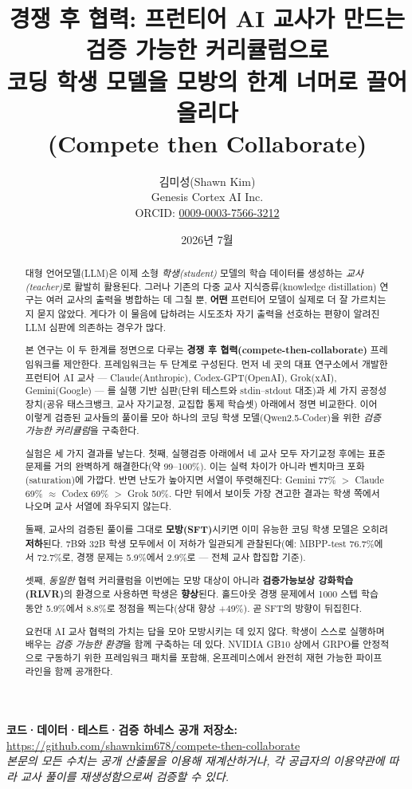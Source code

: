 \documentclass[11pt]{article}
\title{경쟁 후 협력: 프런티어 AI 교사가 만드는 검증 가능한 커리큘럼으로\\
코딩 학생 모델을 모방의 한계 너머로 끌어올리다\\[4pt]
\large\normalfont (Compete then Collaborate)}
\author{김미성(Shawn Kim) \\ \small Genesis Cortex AI Inc. \\ \small ORCID: \href{https://orcid.org/0009-0003-7566-3212}{0009-0003-7566-3212}}
\date{2026년 7월}
\begin{document}
\maketitle

\begin{center}
\small\textbf{코드·데이터·테스트·검증 하네스 공개 저장소:}
\url{https://github.com/shawnkim678/compete-then-collaborate}\\[-2pt]
\small\emph{본문의 모든 수치는 공개 산출물을 이용해 재계산하거나, 각 공급자의 이용약관에 따라 교사 풀이를 재생성함으로써 검증할 수 있다.}
\end{center}

\begin{abstract}
대형 언어모델(LLM)은 이제 소형 \emph{학생(student)} 모델의 학습 데이터를 생성하는 \emph{교사(teacher)}로 활발히 활용된다. 그러나 기존의 다중 교사 지식증류(knowledge distillation) 연구는 여러 교사의 출력을 병합하는 데 그칠 뿐, \textbf{어떤} 프런티어 모델이 실제로 더 잘 가르치는지 묻지 않았다. 게다가 이 물음에 답하려는 시도조차 자기 출력을 선호하는 편향이 알려진 LLM 심판에 의존하는 경우가 많다.

본 연구는 이 두 한계를 정면으로 다루는 \textbf{경쟁 후 협력(compete-then-collaborate)} 프레임워크를 제안한다. 프레임워크는 두 단계로 구성된다. 먼저 네 곳의 대표 연구소에서 개발한 프런티어 AI 교사 --- Claude(Anthropic), Codex-GPT(OpenAI), Grok(xAI), Gemini(Google) --- 를 실행 기반 심판(단위 테스트와 stdin--stdout 대조)과 세 가지 공정성 장치(공유 태스크뱅크, 교사 자기교정, 교집합 통제 학습셋) 아래에서 정면 비교한다. 이어 이렇게 검증된 교사들의 풀이를 모아 하나의 코딩 학생 모델(Qwen2.5-Coder)을 위한 \emph{검증 가능한 커리큘럼}을 구축한다.

실험은 세 가지 결과를 낳는다. 첫째, 실행검증 아래에서 네 교사 모두 자기교정 후에는 표준 문제를 거의 완벽하게 해결한다(약 99--100\%). 이는 실력 차이가 아니라 벤치마크 포화(saturation)에 가깝다. 반면 난도가 높아지면 서열이 뚜렷해진다: Gemini 77\% $>$ Claude 69\% $\approx$ Codex 69\% $>$ Grok 50\%. 다만 뒤에서 보이듯 가장 견고한 결과는 학생 쪽에서 나오며 교사 서열에 좌우되지 않는다.

둘째, 교사의 검증된 풀이를 그대로 \textbf{모방(SFT)}시키면 이미 유능한 코딩 학생 모델은 오히려 \textbf{저하}된다. 7B와 32B 학생 모두에서 이 저하가 일관되게 관찰된다(예: MBPP-test 76.7\%에서 72.7\%로, 경쟁 문제는 5.9\%에서 2.9\%로 --- 전체 교사 합집합 기준).

셋째, \emph{동일한} 협력 커리큘럼을 이번에는 모방 대상이 아니라 \textbf{검증가능보상 강화학습(RLVR)}의 환경으로 사용하면 학생은 \textbf{향상}된다. 홀드아웃 경쟁 문제에서 1000 스텝 학습 동안 5.9\%에서 8.8\%로 정점을 찍는다(상대 향상 +49\%). 곧 SFT의 방향이 뒤집힌다.

요컨대 AI 교사 협력의 가치는 답을 모아 모방시키는 데 있지 않다. 학생이 스스로 실행하며 배우는 \emph{검증 가능한 환경}을 함께 구축하는 데 있다. NVIDIA GB10 상에서 GRPO를 안정적으로 구동하기 위한 프레임워크 패치를 포함해, 온프레미스에서 완전히 재현 가능한 파이프라인을 함께 공개한다.
\end{abstract}
\end{document}
